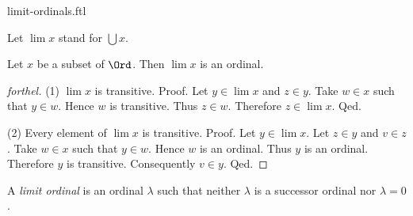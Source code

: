 \documentclass{naproche-library}
\begin{document}
\begin{smodule}[title=Limit Ordinals]{limit-ordinals.ftl}

\begin{forthel}
  Let $\lim x$ stand for $\bigcup x$.
\end{forthel}

\begin{proposition}[forthel,id=SET_THEORY_02_7202164443185152]
  Let $x$ be a subset of $\Ord$.
  Then $\lim x$ is an ordinal.
\end{proposition}
\begin{proof}[forthel]
  (1) $\lim x$ is transitive. \newline
  Proof.
    Let $y \in \lim x$ and $z \in y$.
    Take $w \in x$ such that $y \in w$.
    Hence $w$ is transitive.
    Thus $z \in w$.
    Therefore $z \in \lim x$.
  Qed.

  (2) Every element of $\lim x$ is transitive. \newline
  Proof.
    Let $y \in \lim x$.
    Let $z \in y$ and $v \in z$.
    Take $w \in x$ such that $y \in w$.
    Hence $w$ is an ordinal.
    Thus $y$ is an ordinal.
    Therefore $y$ is transitive.
    Consequently $v \in y$.
  Qed.
\end{proof}

\begin{definition}[forthel,id=SET_THEORY_02_7678388934279168]
  A \emph{limit ordinal} is an ordinal $\lambda$ such that neither $\lambda$ is a successor ordinal nor $\lambda = 0$.
\end{definition}
\end{smodule}
\end{document}
